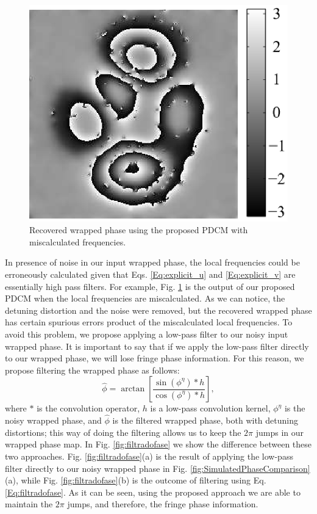 \begin{figure}[Ht!] \label{fig:FaseErrorFrecuencias}
  \begin{center}
      \includegraphics[scale=0.6]{Chpt4_figures/fig_mFaseErrorFrecuencias.eps}
  \end{center}
  \caption{Recovered wrapped phase using the proposed PDCM with 
  miscalculated frequencies.}
\end{figure}

In presence of noise in our input wrapped phase, the local frequencies could be
erroneously calculated given that Eqs. \ref{Eq:explicit_u} and
\ref{Eq:explicit_v} are essentially high pass filters. For example, Fig.
\ref{fig:FaseErrorFrecuencias} is the output of our proposed PDCM
when the local frequencies are miscalculated. As we can notice, the detuning
distortion and the noise were removed, but the recovered wrapped phase has
certain spurious errors product of the miscalculated local frequencies. To
avoid this problem, we propose applying a low-pass filter to our noisy input
wrapped phase. It is important to say that if we apply the low-pass filter
directly to our wrapped phase, we will lose fringe phase information. For this
reason, we propose filtering the wrapped phase as follows:
\begin{equation} \label{Eq:filtradofase}
	\hat{\phi} = \arctan \left[ \frac{\sin(\phi^\eta) * h}
	{\cos(\phi^\eta) * h} \right],
\end{equation}
where $*$ is the convolution operator, $h$ is a low-pass convolution 
kernel, $\phi^\eta$ is the noisy wrapped phase, and $\hat \phi$ is the
filtered wrapped phase, both with detuning distortions; this way of doing
the filtering allows us to keep the $2\pi$ jumps in our wrapped phase map. In
Fig. \ref{fig:filtradofase} we show the difference between these two approaches.
Fig. \ref{fig:filtradofase}(a) is the result of applying the low-pass filter 
directly to our noisy wrapped phase in Fig.
\ref{fig:SimulatedPhaseComparison}(a), while Fig. \ref{fig:filtradofase}(b)
is the outcome of filtering using Eq. \ref{Eq:filtradofase}. As it can be seen,
using the proposed approach we are able to maintain the $2\pi$ jumps, and
therefore, the fringe phase information.

